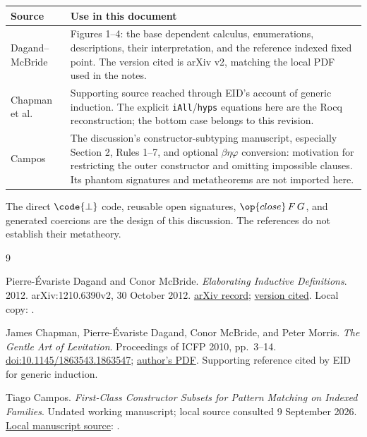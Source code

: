 \newpage
{}
\begin{center}
\begin{tabular}{@{}p{.27\linewidth}p{.67\linewidth}@{}}
\toprule
Source & Use in this document\\
\midrule
Dagand--McBride~\cite{dagand-mcbride-2012}
 & Figures 1--4: the base dependent calculus, enumerations, descriptions,
 their interpretation, and the reference indexed fixed point.
 The version cited is arXiv v2, matching the local PDF used in the notes.\\[5pt]
Chapman et al.~\cite{chapman-et-al-2010}
 & Supporting source reached through EID's account of generic induction.
 The explicit \texttt{iAll}/\texttt{hyps} equations here are the Rocq
 reconstruction; the bottom case belongs to this revision.\\[5pt]
Campos~\cite{campos-constructor-subsets}
 & The discussion's constructor-subtyping manuscript, especially
 Section 2, Rules 1--7, and optional $\beta\eta\varphi$ conversion:
 motivation for restricting the outer constructor and omitting impossible
 clauses. Its phantom signatures and metatheorems are not imported here.\\
\bottomrule
\end{tabular}
\end{center}
The direct $\code{\bot}$ code, reusable open signatures, $\op{close}\,F\,G$,
and generated coercions are the design of this discussion. The references
do not establish their metatheory.

\begin{thebibliography}{9}
\raggedright
{}
Pierre-\'Evariste Dagand and Conor McBride.
\emph{Elaborating Inductive Definitions}.
2012. arXiv:1210.6390v2, 30 October 2012.
\href{https://arxiv.org/abs/1210.6390}{arXiv record};
\href{https://arxiv.org/pdf/1210.6390v2}{version cited}.
Local copy: .

James Chapman, Pierre-\'Evariste Dagand, Conor McBride, and Peter Morris.
\emph{The Gentle Art of Levitation}.
Proceedings of ICFP 2010, pp.~3--14.
\href{https://doi.org/10.1145/1863543.1863547}{doi:10.1145/1863543.1863547};
\href{https://jmchapman.io/papers/levitation.pdf}{author's PDF}.
Supporting reference cited by EID for generic induction.

Tiago Campos.
\emph{First-Class Constructor Subsets for Pattern Matching on Indexed Families}.
Undated working manuscript; local source consulted 9 September 2026.
\href{../../../paper/subtyping_paper.tex}
 {Local manuscript source}:
.
\end{thebibliography}
